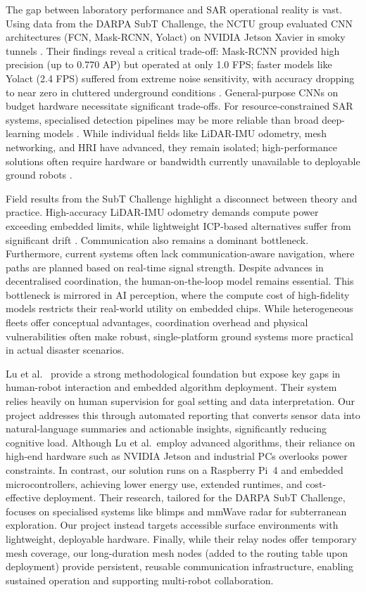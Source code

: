 The gap between laboratory performance and SAR operational reality is vast. Using data from the DARPA SubT Challenge, the NCTU group evaluated CNN architectures (FCN, Mask-RCNN, Yolact) on NVIDIA Jetson Xavier in smoky tunnels \cite{lu2022}. Their findings reveal a critical trade-off: Mask-RCNN provided high precision (up to 0.770 AP) but operated at only 1.0 FPS; faster models like Yolact (2.4 FPS) suffered from extreme noise sensitivity, with accuracy dropping to near zero in cluttered underground conditions \cite{lu2022}. General-purpose CNNs on budget hardware necessitate significant trade-offs. For resource-constrained SAR systems, specialised detection pipelines may be more reliable than broad deep-learning models \cite{lu2022}. While individual fields like LiDAR-IMU odometry, mesh networking, and HRI have advanced, they remain isolated; high-performance solutions often require hardware or bandwidth currently unavailable to deployable ground robots \cite{lee2024}.

Field results from the SubT Challenge highlight a disconnect between theory and practice. High-accuracy LiDAR-IMU odometry demands compute power exceeding embedded limits, while lightweight ICP-based alternatives suffer from significant drift \cite{lu2022}. Communication also remains a dominant bottleneck. Furthermore, current systems often lack communication-aware navigation, where paths are planned based on real-time signal strength. Despite advances in decentralised coordination, the human-on-the-loop model remains essential. This bottleneck is mirrored in AI perception, where the compute cost of high-fidelity models restricts their real-world utility on embedded chips. While heterogeneous fleets offer conceptual advantages, coordination overhead and physical vulnerabilities often make robust, single-platform ground systems more practical in actual disaster scenarios.

Lu et al.\ \cite{lu2022} provide a strong methodological foundation but expose key gaps in human-robot interaction and embedded algorithm deployment. Their system relies heavily on human supervision for goal setting and data interpretation. Our project addresses this through automated reporting that converts sensor data into natural-language summaries and actionable insights, significantly reducing cognitive load. Although Lu et al.\ employ advanced algorithms, their reliance on high-end hardware such as NVIDIA Jetson and industrial PCs overlooks power constraints. In contrast, our solution runs on a Raspberry Pi~4 and embedded microcontrollers, achieving lower energy use, extended runtimes, and cost-effective deployment. Their research, tailored for the DARPA SubT Challenge, focuses on specialised systems like blimps and mmWave radar for subterranean exploration. Our project instead targets accessible surface environments with lightweight, deployable hardware. Finally, while their relay nodes offer temporary mesh coverage, our long-duration mesh nodes (added to the routing table upon deployment) provide persistent, reusable communication infrastructure, enabling sustained operation and supporting multi-robot collaboration.
